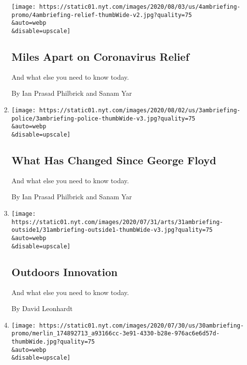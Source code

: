\begin{enumerate}
  \texttt{[image: https://static01.nyt.com/images/2020/08/03/us/4ambriefing-promo/4ambriefing-relief-thumbWide-v2.jpg?quality=75\\\&auto=webp\\\&disable=upscale]}

  \hypertarget{miles-apart-on-coronavirus-relief}{%
  \subsection{Miles Apart on Coronavirus
  Relief}\label{miles-apart-on-coronavirus-relief}}

  And what else you need to know today.

  By Ian Prasad Philbrick and Sanam Yar
\item
  \href{/2020/08/03/briefing/coronavirus-vaccine-tropical-storm-isaias-tiktok-your-monday-briefing.html}{}

  \texttt{[image: https://static01.nyt.com/images/2020/08/02/us/3ambriefing-police/3ambriefing-police-thumbWide-v3.jpg?quality=75\\\&auto=webp\\\&disable=upscale]}

  \hypertarget{what-has-changed-since-george-floyd}{%
  \subsection{What Has Changed Since George
  Floyd}\label{what-has-changed-since-george-floyd}}

  And what else you need to know today.

  By Ian Prasad Philbrick and Sanam Yar
\item
  \href{/2020/07/31/briefing/nba-economy-herman-cain-your-friday-briefing.html}{}

  \texttt{[image: https://static01.nyt.com/images/2020/07/31/arts/31ambriefing-outside1/31ambriefing-outside1-thumbWide-v3.jpg?quality=75\\\&auto=webp\\\&disable=upscale]}

  \hypertarget{outdoors-innovation}{%
  \subsection{Outdoors Innovation}\label{outdoors-innovation}}

  And what else you need to know today.

  By David Leonhardt
\item
  \href{/2020/07/30/briefing/mark-zuckerberg-louie-gohmert-ruth-bader-ginsburg-your-thursday-briefing.html}{}

  \texttt{[image: https://static01.nyt.com/images/2020/07/30/us/30ambriefing-promo/merlin\_174892713\_a93166cc-3e91-4330-b28e-976ac6e6d57d-thumbWide.jpg?quality=75\\\&auto=webp\\\&disable=upscale]}


\end{enumerate}
